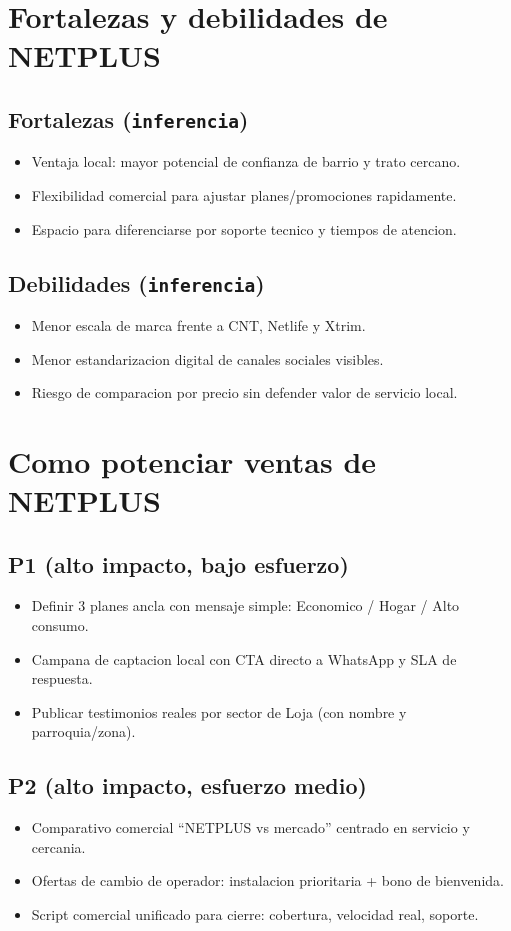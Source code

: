 \documentclass[9pt,a4paper,twocolumn,twoside]{tau-class/tau}
\begin{document}
\section{Fortalezas y debilidades de NETPLUS}
\subsection{Fortalezas (\texttt{inferencia})}
\begin{itemize}
  \item Ventaja local: mayor potencial de confianza de barrio y trato cercano.
  \item Flexibilidad comercial para ajustar planes/promociones rapidamente.
  \item Espacio para diferenciarse por soporte tecnico y tiempos de atencion.
\end{itemize}

\subsection{Debilidades (\texttt{inferencia})}
\begin{itemize}
  \item Menor escala de marca frente a CNT, Netlife y Xtrim.
  \item Menor estandarizacion digital de canales sociales visibles.
  \item Riesgo de comparacion por precio sin defender valor de servicio local.
\end{itemize}

\section{Como potenciar ventas de NETPLUS}
\subsection*{P1 (alto impacto, bajo esfuerzo)}
\begin{itemize}
  \item Definir 3 planes ancla con mensaje simple: Economico / Hogar / Alto consumo.
  \item Campana de captacion local con CTA directo a WhatsApp y SLA de respuesta.
  \item Publicar testimonios reales por sector de Loja (con nombre y parroquia/zona).
\end{itemize}

\subsection*{P2 (alto impacto, esfuerzo medio)}
\begin{itemize}
  \item Comparativo comercial ``NETPLUS vs mercado'' centrado en servicio y cercania.
  \item Ofertas de cambio de operador: instalacion prioritaria + bono de bienvenida.
  \item Script comercial unificado para cierre: cobertura, velocidad real, soporte.
\end{itemize}
\end{document}
